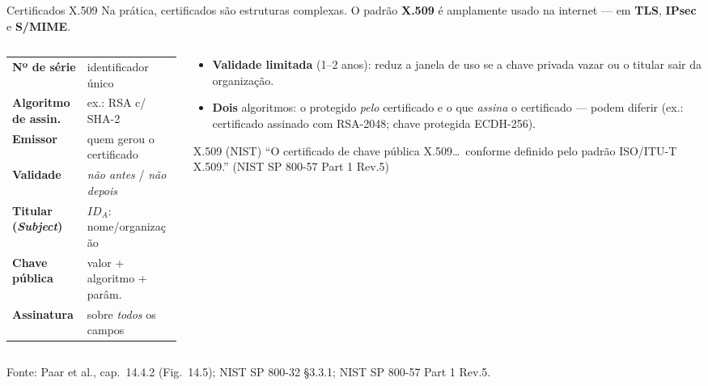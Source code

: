\documentclass{beamer}
\begin{document}
\begin{frame}{Certificados X.509}
    Na prática, certificados são estruturas complexas. O padrão \textbf{X.509} é amplamente usado na internet --- em \textbf{TLS}, \textbf{IPsec} e \textbf{S/MIME}.
    \vspace{0.4em}
    \begin{columns}[T]
        \begin{column}{0.52\textwidth}
            \scriptsize
            \begin{tcolorbox}[colback=blue!4,colframe=blue!50!black,boxrule=0.5pt,title=\scriptsize Certificado X.509 (campos)]
            \renewcommand{\arraystretch}{1.15}
            \begin{tabularx}{\linewidth}{@{}>{\bfseries}l@{\ \ }X@{}}
                Nº de série & identificador único \\
                Algoritmo de assin. & ex.: RSA c/ SHA-2 \\
                Emissor & quem gerou o certificado \\
                Validade & \textit{não antes} / \textit{não depois} \\
                Titular (\textit{Subject}) & $ID_A$: nome/organização \\
                Chave pública & valor + algoritmo + parâm. \\
                \rowcolor{green!12} Assinatura & sobre \emph{todos} os campos \\
            \end{tabularx}
            \end{tcolorbox}
        \end{column}
        \begin{column}{0.46\textwidth}
            \footnotesize
            \begin{itemize}
                \item \textbf{Validade limitada} (1--2 anos): reduz a janela de uso se a chave privada vazar ou o titular sair da organização.
                \item \textbf{Dois} algoritmos: o protegido \emph{pelo} certificado e o que \emph{assina} o certificado --- podem diferir (ex.: certificado assinado com RSA-2048; chave protegida ECDH-256).
            \end{itemize}
            \begin{block}{X.509 (NIST)}
                \tiny ``O certificado de chave pública X.509\dots\ conforme definido pelo padrão ISO/ITU-T X.509.'' (NIST SP 800-57 Part 1 Rev.5)
            \end{block}
        \end{column}
    \end{columns}
    \smallskip
    {\tiny Fonte: Paar et al., cap.\ 14.4.2 (Fig.\ 14.5); NIST SP 800-32 §3.3.1; NIST SP 800-57 Part 1 Rev.5.}
\end{frame}
\end{document}
